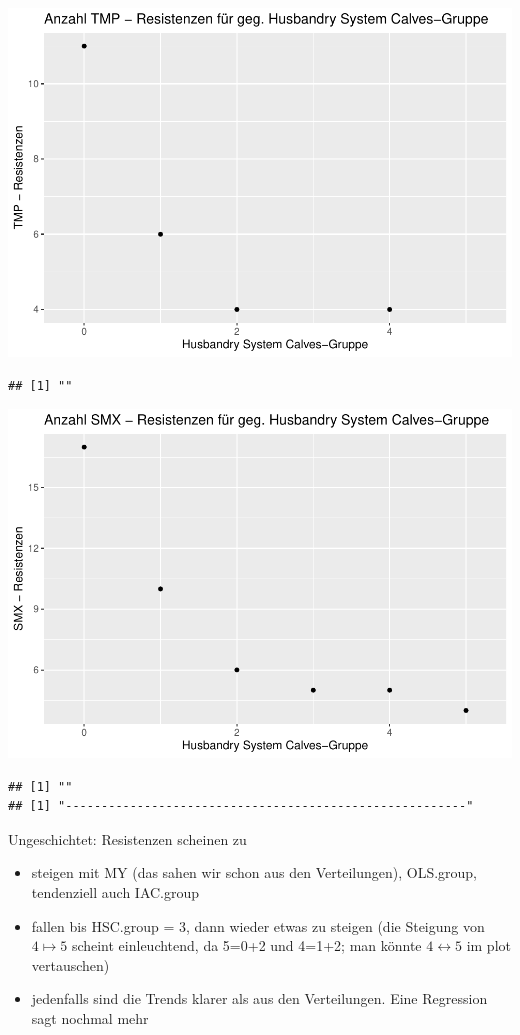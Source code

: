\documentclass[
]{article}
\providecommand{\tightlist}{%
  \setlength{\itemsep}{0pt}\setlength{\parskip}{0pt}}
\begin{document}
\includegraphics{NResistenzen_files/figure-latex/unnamed-chunk-7-39.pdf}

\begin{verbatim}
## [1] ""
\end{verbatim}

\includegraphics{NResistenzen_files/figure-latex/unnamed-chunk-7-40.pdf}

\begin{verbatim}
## [1] ""
## [1] "--------------------------------------------------------"
\end{verbatim}

Ungeschichtet: Resistenzen scheinen zu

\begin{itemize}
\tightlist
\item
  steigen mit MY (das sahen wir schon aus den Verteilungen), OLS.group,
  tendenziell auch IAC.group
\item
  fallen bis HSC.group = 3, dann wieder etwas zu steigen (die Steigung
  von \(4\mapsto5\) scheint einleuchtend, da 5=0+2 und 4=1+2; man könnte
  \(4\leftrightarrow 5\) im plot vertauschen)
\item
  jedenfalls sind die Trends klarer als aus den Verteilungen. Eine
  Regression sagt nochmal mehr
\end{itemize}
\end{document}
